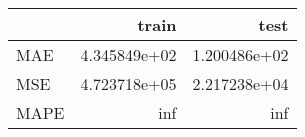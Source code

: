 \begin{tabular}{lrr}
\toprule
{} &         train &          test \\
\midrule
MAE  &  4.345849e+02 &  1.200486e+02 \\
MSE  &  4.723718e+05 &  2.217238e+04 \\
MAPE &           inf &           inf \\
\bottomrule
\end{tabular}
